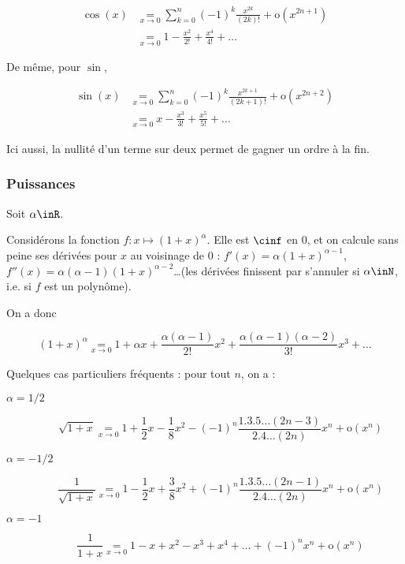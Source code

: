 \documentclass[12pt]{article}
\begin{document}
\begin{align}
\cos(x)&\underset{x\rightarrow 0}{=}\sum_{k=0}^{n} (-1)^k\frac{x^{2k}}{(2k)!}+\text{o}(x^{2n+1})\\
&\underset{x\rightarrow 0}{=}1-\frac{x^2}{2!}+\frac{x^4}{4!}+\dots
\end{align}



De même, pour $\sin$, 

\begin{align}
\sin(x)&\underset{x\rightarrow 0}{=}\sum_{k=0}^{n} (-1)^k\frac{x^{2k+1}}{(2k+1)!}+\text{o}(x^{2n+2})\\
&\underset{x\rightarrow 0}{=}x-\frac{x^3}{3!}+\frac{x^5}{5!}+\dots
\end{align}

Ici aussi, la nullité d'un terme sur deux permet de gagner un ordre à la
fin.



\subsubsection{Puissances}

Soit $\alpha \inR$.

Considérons la fonction $f:x\mapsto(1+x)^\alpha$. Elle est $\cinf$ en $0$, et on
calcule sans peine ses dérivées pour $x$ au voisinage de $0$ :
$f'(x)=\alpha(1+x)^{\alpha-1}$,
$f''(x)=\alpha(\alpha-1)(1+x)^{\alpha-2}$\dots \;(les dérivées finissent par s'annuler si $\alpha\inN$, i.e. si $f$ est un polynôme).

On a donc

$$(1+x)^\alpha \underset{x\rightarrow 0}{=} 1+\alpha x + \frac{\alpha(\alpha-1)}{2!} x^2 +
\frac{\alpha(\alpha-1)(\alpha-2)}{3!} x^3 + \dots$$

Quelques cas particuliers fréquents : pour tout $n$, on a :

\begin{description}

\item[$\alpha=1/2$]

$$\sqrt{1+x} \underset{x\rightarrow 0}{=} 1 +\frac{1}{2} x - \frac{1}{8}
  x^2 - (-1)^n \frac{1.3.5\dots(2n-3)}{2.4\dots(2n)} x^n+  \text{o}(x^n)$$

\item[$\alpha=-1/2$]

$$\frac{1}{\sqrt{1+x}} \underset{x\rightarrow 0}{=} 1 -\frac{1}{2} x + \frac{3}{8} x^2 + (-1)^n \frac{1.3.5\dots(2n-1)}{2.4\dots(2n)} x^n+ \text{o}(x^n)$$

\item[$\alpha=-1$]

$$\frac{1}{1+x} \underset{x\rightarrow 0}{=} 1 - x +  x^2 - x^3 + x^4 +
  \dots + (-1)^nx^n + \text{o}(x^n)$$

\end{description}
\end{document}
